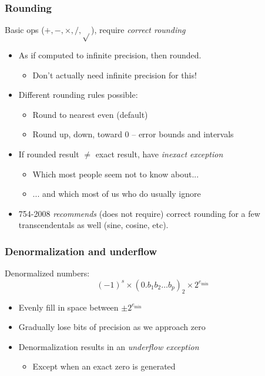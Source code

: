 \documentclass{beamer}
\begin{document}
\begin{frame}
  \frametitle{Rounding}

  Basic ops ($+, -, \times, /, \sqrt{}$), require {\em correct rounding}
  \begin{itemize}
  \item As if computed to infinite precision, then rounded.
    \begin{itemize}
    \item Don't actually need infinite precision for this!
    \end{itemize}
  \item Different rounding rules possible:
    \begin{itemize}
    \item Round to nearest even (default)
    \item Round up, down, toward 0 -- error bounds and intervals
    \end{itemize}
  \item If rounded result $\neq$ exact result, have {\em inexact exception}
    \begin{itemize}
    \item Which most people seem not to know about...
    \item ... and which most of us who do usually ignore
    \end{itemize}
  \item 754-2008 {\em recommends} (does not require) correct rounding
    for a few transcendentals as well (sine, cosine, etc).
  \end{itemize}

\end{frame}


\begin{frame}
  \frametitle{Denormalization and underflow}

  Denormalized numbers:
  \[
    (-1)^s \times (0.b_1 b_2 \ldots b_p)_2 \times 2^{e_{\min}}
  \]
  \begin{itemize}
  \item Evenly fill in space between $\pm 2^{e_{\min}}$
  \item Gradually lose bits of precision as we approach zero
  \item Denormalization results in an {\em underflow exception}
    \begin{itemize}
    \item Except when an exact zero is generated
    \end{itemize}
  \end{itemize}
  
\end{frame}
\end{document}
